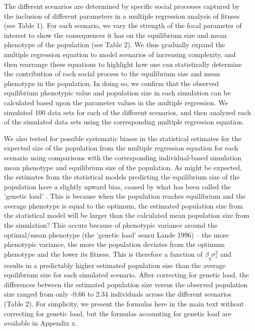 \documentclass{article}
\begin{document}
The different scenarios are determined by specific social processes captured by the inclusion of different parameters in a multiple regression analysis of fitness (see Table 1). For each scenario, we vary the strength of the focal parameter of interest to show the consequences it has on the equilibrium size and mean phenotype of the population (see Table 2). We thus gradually expand the multiple regression equation to model scenarios of increasing complexity, and then rearrange these equations to highlight how one can statistically determine the contribution of each social process to the equilibrium size and mean phenotype in the population. In doing so, we confirm that the observed equilibrium phenotypic value and population size in each simulation can be calculated based upon the parameter values in the multiple regression. We simulated 100 data sets for each of the different scenarios, and then analyzed each of the simulated data sets using the corresponding multiple regression equation.

We also tested for possible systematic biases in the statistical estimates for the expected size of the population from the multiple regression equation for each scenario using comparisons with the corresponding individual-based simulation mean phenotype and equilibrium size of the population. As might be expected, the estimates from the statistical models predicting the equilibrium size of the population have a slightly upward bias, caused by what has been called the 'genetic load' \citep{Lande1996}. This is because when the population reaches equilibrium and the average phenotype is equal to the optimum, the estimated population size from the statistical model will be larger than the calculated mean population size from the simulation? This occurs because of phenotypic variance around the optimal/mean phenotype (the 'genetic load' sensu Lande 1996) -- the more phenotypic variance, the more the population deviates from the optimum phenotype and the lower its fitness. This is therefore a function of $\beta_q \sigma^2_z$ and results in a predictably higher estimated population size than the average equilibrium size for each simulated scenario. After correcting for genetic load, the differences between the estimated population size versus the observed population size ranged from only -0.66 to 2.34 individuals across the different scenarios (Table 2). For simplicity, we present the formulas here in the main text without correcting for genetic load, but the formulas accounting for genetic load are available in Appendix x.   
\end{document}
